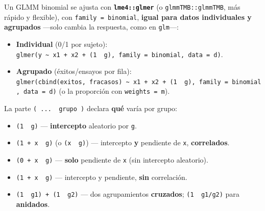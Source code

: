 \documentclass[
  letterpaper,
  DIV=11,
  numbers=noendperiod]{scrartcl}
\providecommand{\tightlist}{%
  \setlength{\itemsep}{0pt}\setlength{\parskip}{0pt}}\usepackage{longtable,booktabs,array}
\begin{document}
\begin{tcolorbox}[enhanced jigsaw, breakable, colframe=quarto-callout-tip-color-frame, left=2mm, arc=.35mm, colbacktitle=quarto-callout-tip-color!10!white, toprule=.15mm, colback=white, coltitle=black, rightrule=.15mm, opacitybacktitle=0.6, title=\textcolor{quarto-callout-tip-color}{\faLightbulb}\hspace{0.5em}{🔧 En R. La sintaxis \texttt{(\ \textbar{}\ )} para cada estructura}, titlerule=0mm, toptitle=1mm, bottomtitle=1mm, leftrule=.75mm, bottomrule=.15mm, opacityback=0]

Un GLMM binomial se ajusta con \textbf{\texttt{lme4::glmer}} (o
\texttt{glmmTMB::glmmTMB}, más rápido y flexible), con
\texttt{family\ =\ binomial}, \textbf{igual para datos individuales y
agrupados} ---solo cambia la respuesta, como en \texttt{glm}---:

\begin{itemize}
\tightlist
\item
  \textbf{Individual} (0/1 por sujeto):
  \texttt{glmer(y\ \textasciitilde{}\ x1\ +\ x2\ +\ (1\ \textbar{}\ g),\ family\ =\ binomial,\ data\ =\ d)}.
\item
  \textbf{Agrupado} (éxitos/ensayos por fila):
  \texttt{glmer(cbind(exitos,\ fracasos)\ \textasciitilde{}\ x1\ +\ x2\ +\ (1\ \textbar{}\ g),\ family\ =\ binomial,\ data\ =\ d)}
  (o la proporción con \texttt{weights\ =\ m}).
\end{itemize}

La parte \texttt{(\ ...\ \textbar{}\ grupo\ )} declara \textbf{qué}
varía por grupo:

\begin{itemize}
\tightlist
\item
  \texttt{(1\ \textbar{}\ g)} --- \textbf{intercepto} aleatorio por
  \texttt{g}.
\item
  \texttt{(1\ +\ x\ \textbar{}\ g)} (o \texttt{(x\ \textbar{}\ g)}) ---
  intercepto \textbf{y} pendiente de \texttt{x}, \textbf{correlados}.
\item
  \texttt{(0\ +\ x\ \textbar{}\ g)} --- \textbf{solo} pendiente de
  \texttt{x} (sin intercepto aleatorio).
\item
  \texttt{(1\ +\ x\ \textbar{}\textbar{}\ g)} --- intercepto y
  pendiente, \textbf{sin} correlación.
\item
  \texttt{(1\ \textbar{}\ g1)\ +\ (1\ \textbar{}\ g2)} --- dos
  agrupamientos \textbf{cruzados}; \texttt{(1\ \textbar{}\ g1/g2)} para
  \textbf{anidados}.
\end{itemize}

\end{tcolorbox}
\end{document}
